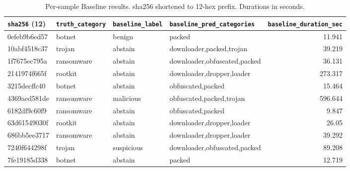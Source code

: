 \begin{table}[htbp]
      \centering
      \scriptsize
      \caption{Per-sample Baseline results. sha256 shortened to 12-hex prefix. Durations in seconds.}
      \label{tab:per-sample-results-baseline}
      \begin{tabular}{l l l l r}
            \hline
            \texttt{sha256} (12) & \texttt{truth\_category} & \texttt{baseline\_label} & \texttt{baseline\_pred\_categories} & \texttt{baseline\_duration\_sec} \\
            \hline
            0efeb9b6ed57         & botnet                   & benign                   & packed                              & 11.941                           \\
            10abf4518c37         & trojan                   & abstain                  & downloader,packed,trojan            & 39.219                           \\
            1f7675ec795a         & ransomware               & abstain                  & downloader,obfuscated,packed        & 36.131                           \\
            2141974f665f         & rootkit                  & abstain                  & downloader,dropper,loader           & 273.317                          \\
            3215decffc40         & botnet                   & abstain                  & obfuscated,packed                   & 15.464                           \\
            4369aed581de         & ransomware               & malicious                & obfuscated,packed,trojan            & 596.644                          \\
            6182df9c60f9         & ransomware               & abstain                  & obfuscated,packed                   & 9.847                            \\
            63d61549030f         & rootkit                  & abstain                  & downloader,dropper,loader           & 26.05                            \\
            686bb5ee3717         & ransomware               & abstain                  & downloader,dropper,loader           & 39.292                           \\
            7240f644298f         & trojan                   & suspicious               & downloader,obfuscated,packed        & 89.208                           \\
            7fe19185d338         & botnet                   & abstain                  & packed                              & 12.719                           \\

\end{tabular}
\end{table}
